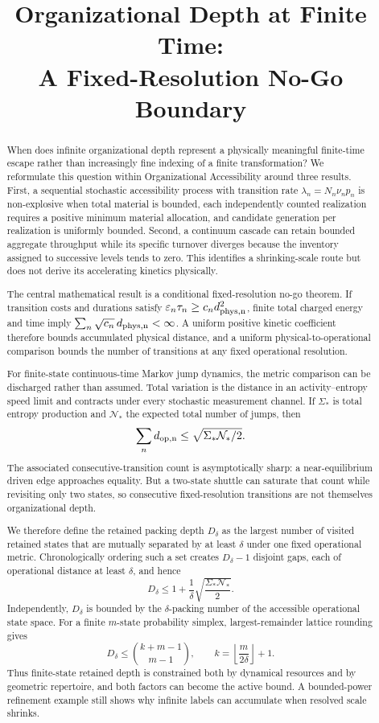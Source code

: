 \documentclass[11pt,a4paper]{article}
\title{Organizational Depth at Finite Time:\\
A Fixed-Resolution No-Go Boundary}
\author{}
\date{}
\theoremstyle{definition}
\numberwithin{equation}{section}
\begin{document}
\maketitle

\begin{abstract}
When does infinite organizational depth represent a physically meaningful
finite-time escape rather than increasingly fine indexing of a finite
transformation? We reformulate this question within Organizational
Accessibility around three results. First, a sequential stochastic
accessibility process with transition rate
$\lambda_n=N_n\nu_np_n$ is non-explosive when total material is bounded,
each independently counted realization requires a positive minimum
material allocation, and candidate generation per realization is uniformly
bounded. Second, a continuum cascade can retain bounded aggregate
throughput while its specific turnover diverges because the inventory
assigned to successive levels tends to zero. This identifies a
shrinking-scale route but does not derive its accelerating kinetics
physically.

The central mathematical result is a conditional fixed-resolution no-go
theorem. If transition costs and durations satisfy
$\varepsilon_n\tau_n\ge c_n d_{\rm phys,n}^2$, finite total charged energy
and time imply
$\sum_n\sqrt{c_n}\,d_{\rm phys,n}<\infty$.
A uniform positive kinetic coefficient therefore bounds accumulated
physical distance, and a uniform physical-to-operational comparison bounds
the number of transitions at any fixed operational resolution.

For finite-state continuous-time Markov jump dynamics, the metric comparison
can be discharged rather than assumed. Total variation is the distance in an
activity--entropy speed limit and contracts under every stochastic measurement
channel. If $\Sigma_*$ is total entropy production and $\mathcal N_*$ the
expected total number of jumps, then
\[
\sum_n d_{\rm op,n}\le\sqrt{\Sigma_*\mathcal N_*/2}.
\]
The associated consecutive-transition count is asymptotically sharp: a
near-equilibrium driven edge approaches equality. But a two-state shuttle can
saturate that count while revisiting only two states, so consecutive
fixed-resolution transitions are not themselves organizational depth.

We therefore define the retained packing depth $D_\delta$ as the largest
number of visited retained states that are mutually separated by at least
$\delta$ under one fixed operational metric. Chronologically ordering such a
set creates $D_\delta-1$ disjoint gaps, each of operational distance at least
$\delta$, and hence
\[
D_\delta
\le
1+\frac1\delta\sqrt{\frac{\Sigma_*\mathcal N_*}{2}}.
\]
Independently,
$D_\delta$ is bounded by the $\delta$-packing number of the accessible
operational state space. For a finite $m$-state probability simplex,
largest-remainder lattice rounding gives
\[
D_\delta
\le
\binom{k+m-1}{m-1},
\qquad
k=\left\lfloor\frac{m}{2\delta}\right\rfloor+1.
\]
Thus finite-state retained depth is constrained both by dynamical resources
and by geometric repertoire, and both factors can become the active bound. A bounded-power refinement example still shows
why infinite labels can accumulate when resolved scale shrinks.


\end{abstract}
\end{document}
